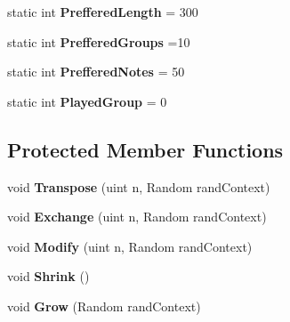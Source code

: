 \begin{DoxyCompactItemize}
\item 
\hypertarget{class_music_population_1_1_member3_a930d4be917d694eaa957ba4989fe7c23}{static int {\bfseries Preffered\+Length} = 300}\label{class_music_population_1_1_member3_a930d4be917d694eaa957ba4989fe7c23}

\item 
\hypertarget{class_music_population_1_1_member3_a3dfb4ff64667f49ab80db4926d38d0d2}{static int {\bfseries Preffered\+Groups} =10}\label{class_music_population_1_1_member3_a3dfb4ff64667f49ab80db4926d38d0d2}

\item 
\hypertarget{class_music_population_1_1_member3_a0151620624164750c4f3f8a06a490586}{static int {\bfseries Preffered\+Notes} = 50}\label{class_music_population_1_1_member3_a0151620624164750c4f3f8a06a490586}

\item 
\hypertarget{class_music_population_1_1_member3_a25ef5c37a1e77339811361dbf40bb0ea}{static int {\bfseries Played\+Group} = 0}\label{class_music_population_1_1_member3_a25ef5c37a1e77339811361dbf40bb0ea}

\end{DoxyCompactItemize}
\subsection*{Protected Member Functions}
\begin{DoxyCompactItemize}
\item 
\hypertarget{class_music_population_1_1_member3_ae9ba132fdb49dbdd756d66b286cb164d}{void {\bfseries Transpose} (uint n, Random rand\+Context)}\label{class_music_population_1_1_member3_ae9ba132fdb49dbdd756d66b286cb164d}

\item 
\hypertarget{class_music_population_1_1_member3_aa081ffe848adf82a4fd2a683b9adb9ea}{void {\bfseries Exchange} (uint n, Random rand\+Context)}\label{class_music_population_1_1_member3_aa081ffe848adf82a4fd2a683b9adb9ea}

\item 
\hypertarget{class_music_population_1_1_member3_a1ae8fde6d20043b2d9e06c7ebb6b08ca}{void {\bfseries Modify} (uint n, Random rand\+Context)}\label{class_music_population_1_1_member3_a1ae8fde6d20043b2d9e06c7ebb6b08ca}

\item 
\hypertarget{class_music_population_1_1_member3_a7b27b07ab3c2ffc20e06d9fae9182dcc}{void {\bfseries Shrink} ()}\label{class_music_population_1_1_member3_a7b27b07ab3c2ffc20e06d9fae9182dcc}

\item 
\hypertarget{class_music_population_1_1_member3_a0e2fd531ab8add6f8b8b737a60bbb006}{void {\bfseries Grow} (Random rand\+Context)}\label{class_music_population_1_1_member3_a0e2fd531ab8add6f8b8b737a60bbb006}

\end{DoxyCompactItemize}

